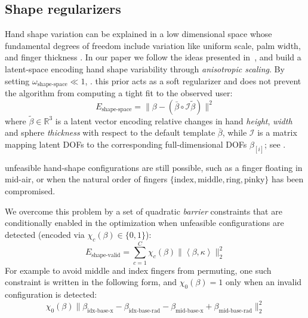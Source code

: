 \subsection{Shape regularizers}
\label{sec:shapeprior}
Hand shape variation can be explained in a low dimensional space whose fundamental degrees of freedom include variation like uniform scale, palm width, and finger thickness \cite{khamis15learning}. In our paper we follow the ideas presented in~\cite{edoardo}, and build a latent-space encoding hand shape variability through \emph{anisotropic scaling}. By setting $\omega_\text{shape-space}{\ll}1$, . this prior acts as a soft regularizer and does not prevent the algorithm from computing a tight fit to the observed user:
% 
\begin{equation}
E_\text{shape-space} = \|\beta - (\bar{\beta} \circ \mathcal{I}\tilde{\beta}) \|^2
\label{eq:shapespace}
\end{equation}
% 
where $\tilde\beta \in \mathbb{R}^3$ is a latent vector encoding relative changes in hand \emph{height}, \emph{width} and sphere \emph{thickness} with respect to the default template $\bar\beta$, while $\mathcal{I}$ is a matrix mapping latent DOFs to the corresponding full-dimensional DOFs $\beta_{[i]}$; see . 
% 
\begin{edit}
 unfeasible hand-shape configurations are still possible, such as a finger floating in mid-air, or when the natural order of fingers $\{\text{index},\text{middle},\text{ring},\text{pinky}\}$ has been compromised. 
\end{edit}
We overcome this problem by a set of quadratic \emph{barrier} constraints that are conditionally enabled in the optimization when unfeasible configurations are detected (encoded via $\chi_c(\beta) \in \{ 0,1 \}$):
% 
\begin{equation}
E_\text{shape-valid} = \sum_{c=1}^C \chi_c(\beta) \| \left< \beta, \kappa \right> \|_2^2
\label{eq:valideshape}
\end{equation}
% 
For example to avoid middle and index fingers from permuting, one such constraint is written in the following form, and $\chi_0(\beta)=1$ only when an invalid configuration is detected:
% 
\begin{equation*}
\chi_0(\beta) \| \beta_\text{idx-base-x} - \beta_\text{idx-base-rad} - \beta_\text{mid-base-x} + \beta_\text{mid-base-rad} \|_2^2
\end{equation*}
